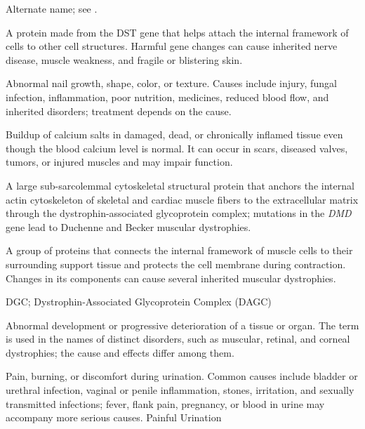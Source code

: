  Alternate name; see .


 A protein made from the DST gene that helps attach the internal framework of cells to other cell structures. Harmful gene changes can cause inherited nerve disease, muscle weakness, and fragile or blistering skin.

 Abnormal nail growth, shape, color, or texture. Causes include injury, fungal infection, inflammation, poor nutrition, medicines, reduced blood flow, and inherited disorders; treatment depends on the cause.

 Buildup of calcium salts in damaged, dead, or chronically inflamed tissue even though the blood calcium level is normal. It can occur in scars, diseased valves, tumors, or injured muscles and may impair function.

 A large sub-sarcolemmal cytoskeletal structural protein that anchors the internal actin cytoskeleton of skeletal and cardiac muscle fibers to the extracellular matrix through the dystrophin-associated glycoprotein complex; mutations in the \textit{DMD} gene lead to Duchenne and Becker muscular dystrophies.

 A group of proteins that connects the internal framework of muscle cells to their surrounding support tissue and protects the cell membrane during contraction. Changes in its components can cause several inherited muscular dystrophies.

\synonyms
DGC; Dystrophin-Associated Glycoprotein Complex (DAGC)

 Abnormal development or progressive deterioration of a tissue or organ. The term is used in the names of distinct disorders, such as muscular, retinal, and corneal dystrophies; the cause and effects differ among them.

 Pain, burning, or discomfort during urination. Common causes include bladder or urethral infection, vaginal or penile inflammation, stones, irritation, and sexually transmitted infections; fever, flank pain, pregnancy, or blood in urine may accompany more serious causes.
\synonyms
Painful Urination
